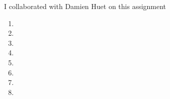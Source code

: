 \documentclass[letterpaper,11pt]{article}
\begin{document}
I collaborated with Damien Huet on this assignment
\begin{enumerate}
\item 
\item 
\item 
\item 
\item 
\item 
\item 
\item 
\end{enumerate}
\end{document}
